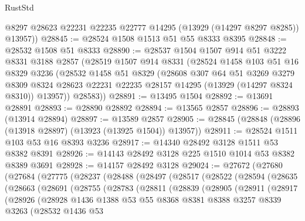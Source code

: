 \begin{lexlean}{RustStd}
\begin{coremodule}
        @8297
        @28623
        @22231
        @22235
        @22777
        @14295
        (@13929 (@14297 @8297 @8285))
        @13957))
@28845 := @28524 @1508 @1513 @51 @55 @8333 @8395
@28848 := @28532 @1508 @51 @8333
@28890 := @28537
    @1504
    @1507
    @914
    @51
    @3222
    @8331
    @3188
    @2857
    (@28519
      @1507
      @914
      @8331
      (@28524
        @1458
        @103
        @51
        @16
        @8329
        @3236
        (@28532
          @1458
          @51
          @8329
          (@28608
            @307
            @64
            @51
            @3269
            @3279
            @8309
            @8324
            @28623
            @22231
            @22235
            @28157
            @14295
            (@13929 (@14297 @8324 @8310))
            @13957))
        @28583))
@28891 := @13495 @1504
@28892 := @13691 @28891
@28893 := @28890 @28892
@28894 := @13565 @2857
@28896 := @28893 (@13914 @28894)
@28897 := @13589 @2857
@28905 := @28845 (@28848 (@28896 (@13918 @28897) (@13923 (@13925 @1504)) @13957))
@28911 := @28524 @1511 @103 @53 @16 @8393 @3236
@28917 := @14340 @28492 @3128 @1511 @53 @8382 @8391
@28926 := @14143 @28492 @3128 @225 @1510 @1014 @53 @8382 @8389 @3691
@28928 := @14157 @28492 @3128
@29024 := @27672
    (@27680
      (@27684
        (@27775
          (@28237
            (@28488
              (@28497
                (@28517
                  (@28522
                    (@28594
                      (@28635
                        (@28663
                          (@28691
                            (@28755
                              (@28783
                                (@28811
                                  (@28839
                                    (@28905
                                      (@28911
                                        (@28917
                                          (@28926
                                            (@28928
                                              @1436
                                              @1388
                                              @53
                                              @55
                                              @8368
                                              @8381
                                              @8388
                                              @3257
                                              @8339
                                              @3263
                                              (@28532
                                                @1436
                                                @53

\end{coremodule}
\end{lexlean}
